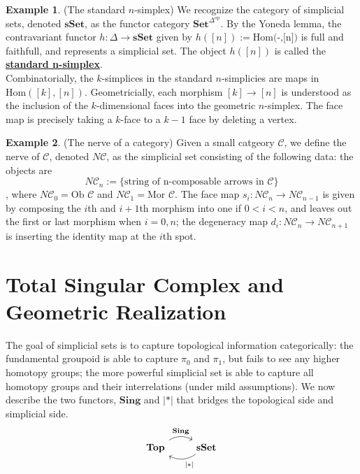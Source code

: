 \documentclass{article}
\theoremstyle{definition}
\theoremstyle{definition}
\theoremstyle{definition}
\theoremstyle{definition}
\theoremstyle{definition}
\theoremstyle{definition}
\theoremstyle{definition}
\newtheorem{example}{Example}[theorem]
\begin{document}
\begin{tcolorbox}[colback=yellow!5!white,colframe=yellow!30!white]
\begin{example}
(The standard $n$-simplex) We recognize the category of simplicial sets, denoted $\textbf{sSet}$, as the functor category $\textbf{Set}^{\Delta^{\textrm{op}}}$. By the Yoneda lemma, the contravariant functor $h: \Delta \to \textbf{sSet}$ given by $h([n]):=\textrm{Hom(-,[n])}$ is full and faithfull, and represents a simplicial set. The object $h([n])$ is called the \underline{\textbf{standard n-simplex}}.\\

Combinatorially, the $k$-simplices in the standard $n$-simplicies are maps in $\textrm{Hom}([k],[n])$. Geometricially, each morphism $[k]\to [n]$ is understood as the inclusion of the $k$-dimensional faces into the geometric $n$-simplex. The face map is precisely taking a $k$-face to a $k-1$ face by deleting a vertex.
\end{example}
\end{tcolorbox}


\begin{tcolorbox}[colback=yellow!5!white,colframe=yellow!30!white]
\begin{example}
(The nerve of a category) Given a small catgeory $\mathcal{C}$, we define the nerve of $\mathcal{C}$, denoted $N\mathcal{C}$, as the simplicial set consisting of the following data: the objects are $$N\mathcal{C}_n:=\{\textrm{string of n-composable arrows in } \mathcal{C} \}$$, where $N\mathcal{C}_0=\textrm{Ob } \mathcal{C}$ and $N\mathcal{C}_1=\textrm{Mor } \mathcal{C}$. The face map $s_i: N\mathcal{C}_n\to N\mathcal{C}_{n-1}$ is given by composing the $i$th and $i+1$th morphism into one if $0<i<n$, and leaves out the first or last morphism when $i=0,n$; the degeneracy map $d_i: N\mathcal{C}_n\to N\mathcal{C}_{n+1}$ is inserting the identity map at the $i$th spot.
\end{example}
\end{tcolorbox}




\section{Total Singular Complex and Geometric Realization}
The goal of simplicial sets is to capture topological information categorically: the fundamental groupoid is able to capture $\pi_0$ and $\pi_1$, but fails to see any higher homotopy groups; the more powerful simplicial set is able to capture all homotopy groups and their interrelations (under mild assumptions). We now describe the two functors, $\textbf{Sing}$ and $|*|$ that bridges the topological side and simplicial side.
\[
\begin{tikzcd}
\textbf{Top}\arrow[r,bend left,"\textbf{Sing}"]&\textbf{sSet}\arrow[l, bend left,"|*|"]
\end{tikzcd}
\]
\end{document}
